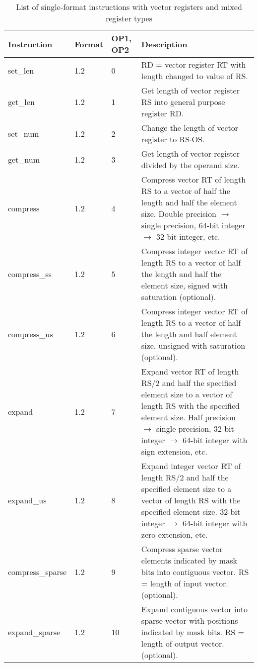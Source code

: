 \documentclass[forwardcom.tex]{subfiles}
\begin{document}
\begin{longtable} {|p{20mm}|p{10mm}|p{8mm}|p{75mm}|}
\caption{List of single-format instructions with vector registers and mixed register types} 
\label{table:ListOfSingleFormatInstructionsVector} \\
\endfirsthead
\endhead
\hline
\bfseries Instruction & \bfseries Format &\bfseries OP1, OP2 & \bfseries Description \\
\hline
set\_len      & 1.2 &  0 & RD = vector register RT with length changed to value of RS. \\
get\_len      & 1.2 &  1 & Get length of vector register RS into general purpose register RD. \\
set\_num      & 1.2 &  2 & Change the length of vector register to RS$\cdot$OS. \\
get\_num      & 1.2 &  3 & Get length of vector register divided by the operand size. \\
compress      & 1.2 &  4 & Compress vector RT of length RS to a vector of half the length and half the element size. Double precision $\rightarrow$ single precision, 64-bit
integer $\rightarrow$ 32-bit integer, etc. \\
compress\_ss  & 1.2 &  5 & Compress integer vector RT of length RS to a vector of half the length and half the element size, signed with saturation (optional). \\
compress\_us  & 1.2 &  6 & Compress integer vector RT of length RS to a vector of half the length and half element size, unsigned with saturation (optional). \\
expand        & 1.2 &  7 & Expand vector RT of length RS/2 and half the specified element size to a vector of length RS with the specified element size. Half
precision $\rightarrow$ single precision, 32-bit integer $\rightarrow$ 64-bit integer with sign extension, etc. \\
expand\_us    & 1.2 &  8 & Expand integer vector RT of length RS/2 and half the specified element size to a vector of length RS with the specified element
size. 32-bit integer $\rightarrow$ 64-bit integer with zero extension, etc. \\
compress\_sparse&1.2 &  9 & Compress sparse vector elements indicated by mask bits into contiguous vector. RS = length of input vector. (optional). \\
expand\_sparse& 1.2 & 10 & Expand contiguous vector into sparse vector with positions
indicated by mask bits. RS = length of output vector. (optional). \\

\end{longtable}
\end{document}
